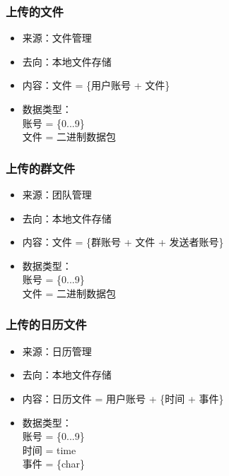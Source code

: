            \subsubsection{上传的文件}
            \begin{itemize}
            \item 来源：文件管理
            \item 去向：本地文件存储
            \item 内容：文件 = \{用户账号 + 文件\}
            \item 数据类型：\\
            账号 = \{0...9\}\\
            文件 = 二进制数据包\\
            \end{itemize}

            \subsubsection{上传的群文件}
            \begin{itemize}
            \item 来源：团队管理
            \item 去向：本地文件存储
            \item 内容：文件 = \{群账号 + 文件 + 发送者账号\}
            \item 数据类型：\\
            账号 = \{0...9\}\\
            文件 = 二进制数据包\\
            \end{itemize}

            \subsubsection{上传的日历文件}
            \begin{itemize}
            \item 来源：日历管理
            \item 去向：本地文件存储
            \item 内容：日历文件 = 用户账号 + \{时间 + 事件\}
            \item 数据类型：\\
            账号 = \{0...9\}\\
            时间 = time\\
            事件 = \{char\}\\
            \end{itemize}

